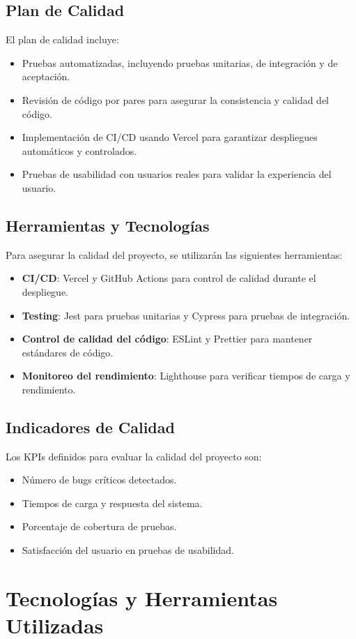 \subsection{Plan de Calidad}
El plan de calidad incluye:
\begin{itemize}
    \item Pruebas automatizadas, incluyendo pruebas unitarias, de integración y de aceptación.
    \item Revisión de código por pares para asegurar la consistencia y calidad del código.
    \item Implementación de CI/CD usando Vercel para garantizar despliegues automáticos y controlados.
    \item Pruebas de usabilidad con usuarios reales para validar la experiencia del usuario.
\end{itemize}

\subsection{Herramientas y Tecnologías}
Para asegurar la calidad del proyecto, se utilizarán las siguientes herramientas:
\begin{itemize}
    \item \textbf{CI/CD}: Vercel y GitHub Actions para control de calidad durante el despliegue.
    \item \textbf{Testing}: Jest para pruebas unitarias y Cypress para pruebas de integración.
    \item \textbf{Control de calidad del código}: ESLint y Prettier para mantener estándares de código.
    \item \textbf{Monitoreo del rendimiento}: Lighthouse para verificar tiempos de carga y rendimiento.
\end{itemize}

\subsection{Indicadores de Calidad}
Los KPIs definidos para evaluar la calidad del proyecto son:
\begin{itemize}
    \item Número de bugs críticos detectados.
    \item Tiempos de carga y respuesta del sistema.
    \item Porcentaje de cobertura de pruebas.
    \item Satisfacción del usuario en pruebas de usabilidad.
\end{itemize}


\section{Tecnologías y Herramientas Utilizadas}
